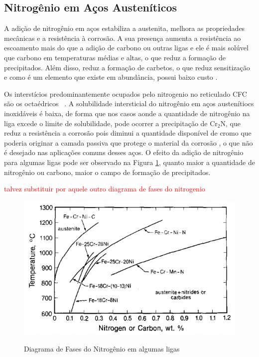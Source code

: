 \documentclass[]{politex}
\newcommand\myworries[1]{\textcolor{red}{#1}}
\begin{document}
\subsection{Nitrogênio em Aços Austeníticos}
	A adição de nitrogênio em aços estabiliza a austenita, melhora as propriedades mecânicas e a resistência à corrosão. A sua presença aumenta a resistência ao escoamento mais do que a adição de carbono ou outras ligas e ele é mais solúvel que carbono em temperaturas médias e altas, o que reduz a formação de precipitados. Além disso, reduz a formação de carbetos, o que reduz sensitização e como é um elemento que existe em abundância, possui baixo custo \cite{reed1989nitrogen}.\par
	Os interstícios predominantemente ocupados pelo nitrogenio no reticulado CFC são os octaédricos ~\cite{christiansen2006controlled}. A solubilidade intersticial do nitrogênio em aços austenítiocs inoxidáveis é baixa, de forma que nos casos aonde a quantidade de nitrogênio na liga excede o limite de solubilidade, pode ocorrer a precipitação de Cr$_{2}$N, que reduz a resistência a corrosão pois diminui a quantidade disponível de cromo que poderia originar a camada passiva que protege o material da corrosão \cite{somers2018expanded}, o que não é desejado nas aplicações comuns desses aços. O efeito da adição de nitrogênio para algumas ligas pode ser observado na Figura \ref{fig:diagrN}, quanto maior a quantidade de nitrogênio ou carbono, maior o campo de formação de precipitados.\par
\myworries{talvez substituir por aquele outro diagrama de fases do nitrogenio}
	\begin{figure}[ht]
	\caption{Diagrama de Fases do Nitrogênio em algumas ligas}
	\includegraphics{solubN}
	\label{fig:diagrN}
	\centering
	\end{figure}
	
\end{document}
